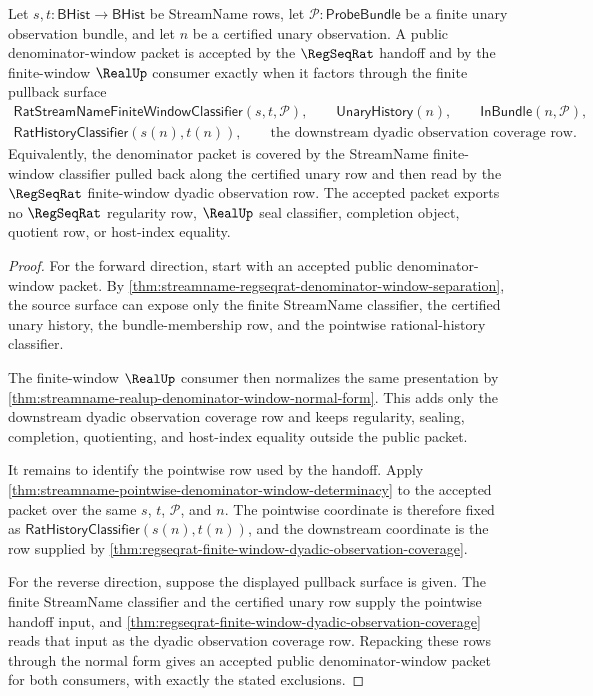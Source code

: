 \begin{theorem}
\label{thm:streamname-regseqrat-denominator-pullback-coverage}
Let $s,t:\mathsf{BHist}\to\mathsf{BHist}$ be StreamName rows, let
$\mathcal P:\mathsf{ProbeBundle}$ be a finite unary observation bundle, and
let $n$ be a certified unary observation. A public denominator-window packet is
accepted by the $\RegSeqRat$ handoff and by the finite-window $\RealUp$
consumer exactly when it factors through the finite pullback surface
$$
\begin{gathered}
\mathsf{RatStreamNameFiniteWindowClassifier}(s,t,\mathcal P),\qquad
\mathsf{UnaryHistory}(n),\qquad
\mathsf{InBundle}(n,\mathcal P),\\
\mathsf{RatHistoryClassifier}(s(n),t(n)),\qquad
\text{the downstream dyadic observation coverage row.}
\end{gathered}
$$
Equivalently, the denominator packet is covered by the StreamName finite-window
classifier pulled back along the certified unary row and then read by the
$\RegSeqRat$ finite-window dyadic observation row. The accepted packet exports
no $\RegSeqRat$ regularity row, $\RealUp$ seal classifier, completion object,
quotient row, or host-index equality.
\end{theorem}
\begin{proof}
For the forward direction, start with an accepted public denominator-window
packet. By
\autoref{thm:streamname-regseqrat-denominator-window-separation}, the source
surface can expose only the finite StreamName classifier, the certified unary
history, the bundle-membership row, and the pointwise rational-history
classifier.

The finite-window $\RealUp$ consumer then normalizes the same presentation by
\autoref{thm:streamname-realup-denominator-window-normal-form}. This adds only
the downstream dyadic observation coverage row and keeps regularity, sealing,
completion, quotienting, and host-index equality outside the public packet.

It remains to identify the pointwise row used by the handoff. Apply
\autoref{thm:streamname-pointwise-denominator-window-determinacy} to the
accepted packet over the same $s$, $t$, $\mathcal P$, and $n$. The pointwise
coordinate is therefore fixed as
$\mathsf{RatHistoryClassifier}(s(n),t(n))$, and the downstream coordinate is
the row supplied by
\autoref{thm:regseqrat-finite-window-dyadic-observation-coverage}.

For the reverse direction, suppose the displayed pullback surface is given.
The finite StreamName classifier and the certified unary row supply the
pointwise handoff input, and
\autoref{thm:regseqrat-finite-window-dyadic-observation-coverage} reads that
input as the dyadic observation coverage row. Repacking these rows through the
normal form gives an accepted public denominator-window packet for both
consumers, with exactly the stated exclusions.
\end{proof}

